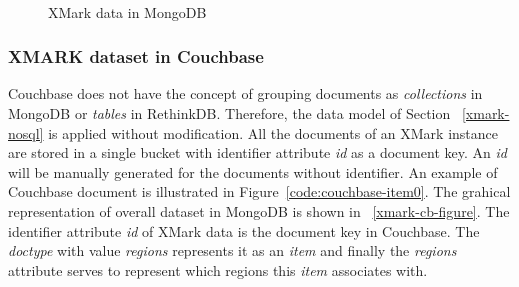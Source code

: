\begin{figure}[hbtp]
\centering
{}
\\
\centering
{}

\caption{XMark data in MongoDB}
\label{xmark-mongodb-figure}
\end{figure}
				
\subsubsection{XMARK dataset in Couchbase} \label{xmark-couchbase}


%

Couchbase does not have the concept of grouping documents as \textit{collections} in MongoDB  or \textit{tables} in RethinkDB. 
Therefore, the data model of Section ~\ref{xmark-nosql} is applied without modification.
 All the documents of an XMark instance  are stored in a single bucket with identifier attribute \textit{id} as a document key. An \textit{id} will be manually generated for the documents without identifier.
An example of Couchbase document is illustrated in Figure~\ref{code:couchbase-item0}. The grahical representation of overall dataset in MongoDB is shown in ~\ref{xmark-cb-figure}. The identifier attribute \textit{id}  of XMark data is the document key in Couchbase. The \textit{doctype} with  value \textit{regions} represents it as an \textit{item} and finally the \textit{regions} attribute serves to represent which regions this \textit{item} associates with.

